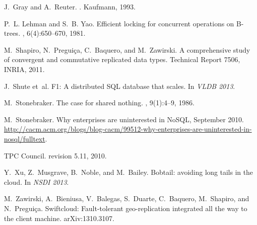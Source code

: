 \documentclass[9pt]{article}
\begin{document}
\begin{thebibliography}{10}
J.~Gray and A.~Reuter.
.
\newblock Kaufmann, 1993.

P.~L. Lehman and S.~B. Yao.
\newblock Efficient locking for concurrent operations on {B-trees}.
, 6(4):650--670,
  1981.

M.~Shapiro, N.~Pregui{\c{c}}a, C.~Baquero, and M.~Zawirski.
\newblock A comprehensive study of convergent and commutative replicated data
  types.
\newblock Technical Report 7506, INRIA, 2011.

J.~Shute et~al.
\newblock F1: A distributed {SQL} database that scales.
\newblock In {\em VLDB 2013}.

M.~Stonebraker.
\newblock The case for shared nothing.
, 9(1):4--9, 1986.

M.~Stonebraker.
\newblock Why enterprises are uninterested in {NoSQL}, September 2010.
\newblock
  \url{http://cacm.acm.org/blogs/blog-cacm/99512-why-enterprises-are-uninterested-in-nosql/fulltext}.

{TPC Council}.
 revision 5.11, 2010.

Y.~Xu, Z.~Musgrave, B.~Noble, and M.~Bailey.
\newblock Bobtail: avoiding long tails in the cloud.
\newblock In {\em NSDI 2013}.

M.~Zawirski, A.~Bieniusa, V.~Balegas, S.~Duarte, C.~Baquero, M.~Shapiro, and
  N.~Pregui{\c{c}}a.
\newblock Swiftcloud: Fault-tolerant geo-replication integrated all the way to
  the client machine.
\newblock arXiv:1310.3107.

\end{thebibliography}

\end{document}
